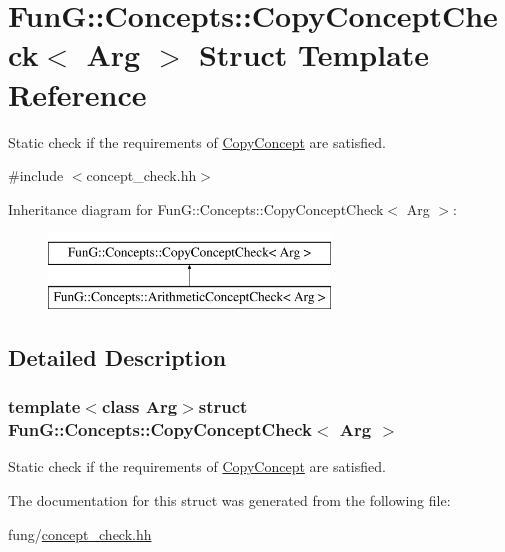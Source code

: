 \hypertarget{structFunG_1_1Concepts_1_1CopyConceptCheck}{\section{Fun\-G\-:\-:Concepts\-:\-:Copy\-Concept\-Check$<$ Arg $>$ Struct Template Reference}
\label{structFunG_1_1Concepts_1_1CopyConceptCheck}
}


Static check if the requirements of \hyperlink{structFunG_1_1Concepts_1_1CopyConcept}{Copy\-Concept} are satisfied.  




{\ttfamily \#include $<$concept\-\_\-check.\-hh$>$}

Inheritance diagram for Fun\-G\-:\-:Concepts\-:\-:Copy\-Concept\-Check$<$ Arg $>$\-:\begin{figure}[H]
\begin{center}
\leavevmode
\includegraphics[height=2.000000cm]{structFunG_1_1Concepts_1_1CopyConceptCheck}
\end{center}
\end{figure}


\subsection{Detailed Description}
\subsubsection*{template$<$class Arg$>$struct Fun\-G\-::\-Concepts\-::\-Copy\-Concept\-Check$<$ Arg $>$}

Static check if the requirements of \hyperlink{structFunG_1_1Concepts_1_1CopyConcept}{Copy\-Concept} are satisfied. 

The documentation for this struct was generated from the following file\-:\begin{DoxyCompactItemize}
\item 
fung/\hyperlink{concept__check_8hh}{concept\-\_\-check.\-hh}\end{DoxyCompactItemize}
